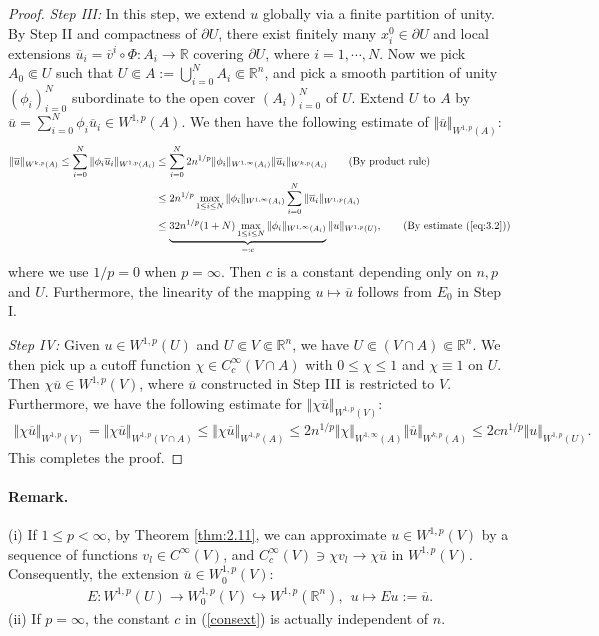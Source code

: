 \documentclass{article}
\numberwithin{equation}{section}
\newcommand{\bbR}{\mathbb{R}}
\newcommand{\ol}{\overline}
\theoremstyle{plain}
\theoremstyle{definition}
\begin{document}
\begin{proof}
\textit{Step III:} In this step, we extend $u$ globally via a finite partition of unity. By Step II and compactness of $\partial U$, there exist finitely many $x_i^0\in\partial U$ and local extensions $\ol{u}_i=\ol{v}^i\circ\Phi:A_i\to\bbR$ covering $\partial U$, where $i=1,\cdots,N$. Now we pick $A_0\Subset U$ such that $U\Subset A:=\bigcup_{i=0}^NA_i\Subset\bbR^n$, and pick a smooth partition of unity $(\phi_i)_{i=0}^N$ subordinate to the open cover $(A_i)_{i=0}^N$ of $U$. Extend $U$ to $A$ by $\ol{u}=\sum_{i=0}^N\phi_i\ol{u}_i\in W^{1,p}(A)$.
We then have the following estimate of $\Vert\ol{u}\Vert_{W^{1,p}(A)}$:
\begin{align*}
\Vert\ol{u}\Vert_{W^{k,p}(A)}\leq\sum_{i=0}^N\Vert\phi_i\ol{u}_i\Vert_{W^{1,p}(A_i)}&\leq\sum_{i=0}^N 2n^{1/p}\Vert\phi_i\Vert_{W^{1,\infty}(A_i)}\Vert\ol{u}_i\Vert_{W^{k,p}(A_i)}\tag{By product rule}\\
&\leq 2n^{1/p}\max_{1\leq i\leq N}\Vert \phi_i\Vert_{W^{1,\infty}(A_i)}\sum_{i=0}^N\Vert\ol{u}_i\Vert_{W^{1,p}(A_i)}\\
&\leq\underbrace{32n^{1/p}(1+N)\max_{1\leq i\leq N}\Vert \phi_i\Vert_{W^{1,\infty}(A_i)}}_{=:c}\Vert u\Vert_{W^{1,p}(U)},\tag{By estimate (\ref{eq:3.2})}
\end{align*}
where we use $1/p=0$ when $p=\infty$. Then $c$ is a constant depending only on $n,p$ and $U$. Furthermore, the linearity of the mapping $u\mapsto\ol{u}$ follows from $E_0$ in Step I.\vspace{0.1cm}

\textit{Step IV:} Given $u\in W^{1,p}(U)$ and $U\Subset V\Subset\bbR^n$, we have $U\Subset(V\cap A)\Subset\bbR^n$. We then pick up a cutoff function $\chi\in C_c^\infty(V\cap A)$ with $0\leq\chi\leq 1$ and $\chi\equiv 1$ on $U$. Then $\chi\ol{u}\in W^{1,p}(V)$, where $\ol{u}$ constructed in Step III is restricted to $V$. Furthermore, we have the following estimate for $\Vert\chi\ol{u}\Vert_{W^{1,p}(V)}$:
\begin{align*}
	\Vert\chi\ol{u}\Vert_{W^{1,p}(V)}=\Vert\chi\ol{u}\Vert_{W^{1,p}(V\cap A)}\leq\Vert\chi\ol{u}\Vert_{W^{1,p}(A)}\leq 2n^{1/p}\Vert\chi\Vert_{W^{1,\infty}(A)}\Vert\ol{u}\Vert_{W^{k,p}(A)}\leq 2cn^{1/p}\Vert u\Vert_{W^{1,p}(U)}.
\end{align*}
This completes the proof.
\end{proof}

\paragraph{Remark.} (i) If $1\leq p<\infty$, by Theorem \ref{thm:2.11}, we can approximate $u\in W^{1,p}(V)$ by a sequence of functions $v_l\in C^\infty(V)$, and $C^\infty_c(V)\ni \chi v_l\to \chi\ol{u}$ in $W^{1,p}(V)$. Consequently, the extension $\ol{u}\in W_0^{1,p}(V)$:
\begin{align*}
	E:W^{1,p}(U)\to W^{1,p}_0(V)\hookrightarrow W^{1,p}(\bbR^n),\ \ u\mapsto Eu:=\ol{u}.
\end{align*}
(ii) If $p=\infty$, the constant $c$ in (\ref{consext}) is actually independent of $n$.
\end{document}
